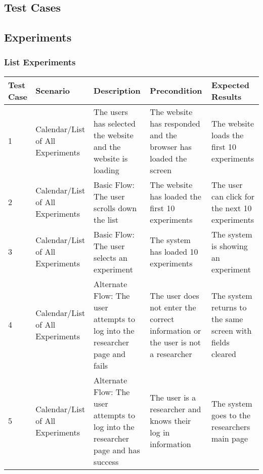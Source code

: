 \begin{landscape}
\section{Test Cases}
\subsection{Experiments}
\subsubsection{List Experiments}
\begin{table}[!h]
    \begin{tabular}{|p{.6in}|p{1in}|p{2.5in}|p{2in}|p{2.5in}|}
        \hline
        Test Case & Scenario & Description & Precondition & Expected Results \\ \hline
        1 & Calendar/List of All Experiments & The users has selected the website and the website is loading & The website has responded and the browser has loaded the screen & The website loads the first 10 experiments \\ \hline
        2 & Calendar/List of All Experiments & Basic Flow: The user scrolls down the list & The website has loaded the first 10 experiments & The user can click for the next 10 experiments \\ \hline
        3 & Calendar/List of All Experiments & Basic Flow: The user selects an experiment & The system has loaded 10 experiments & The system is showing an experiment \\ \hline
        4 & Calendar/List of All Experiments & Alternate Flow: The user attempts to log into the researcher page and fails & The user does not enter the correct information or the user is not  a researcher & The system returns to the same screen with fields cleared \\ \hline
        5 & Calendar/List of All Experiments & Alternate Flow: The user attempts to log into the researcher page and has success & The user is a researcher and knows their log in information & The system goes to the researchers main page \\ \hline
    \end{tabular}
\end{table}


\end{landscape}
